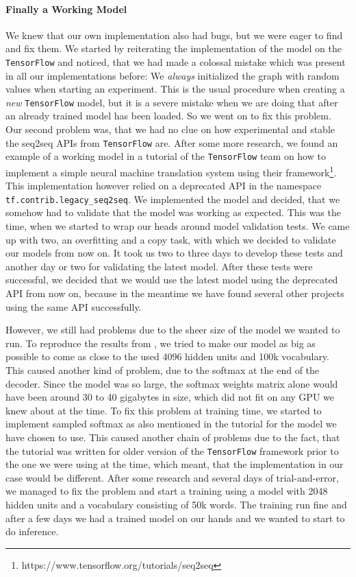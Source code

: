 \paragraph{Finally a Working Model} We knew that our own implementation also had bugs, but we were eager to find and fix them. We started by reiterating the implementation of the model on the \texttt{TensorFlow} and noticed, that we had made a colossal mistake which was present in all our implementations before: We \emph{always} initialized the graph with random values when starting an experiment. This is the usual procedure when creating a \emph{new} \texttt{TensorFlow} model, but it is a severe mistake when we are doing that after an already trained model has been loaded. So we went on to fix this problem. Our second problem was, that we had no clue on how experimental and stable the seq2seq APIs from \texttt{TensorFlow} are. After some more research, we found an example of a working model in a tutorial of the \texttt{TensorFlow} team on how to implement a simple neural machine translation system using their framework\footnote{https://www.tensorflow.org/tutorials/seq2seq}. This implementation however relied on a deprecated API in the namespace \texttt{tf.contrib.legacy\_seq2seq}. We implemented the model and decided, that we somehow had to validate that the model was working as expected. This was the time, when we started to wrap our heads around model validation tests. We came up with two, an overfitting and a copy task, with which we decided to validate our models from now on. It took us two to three days to develop these tests and another day or two for validating the latest model. After these tests were successful, we decided that we would use the latest model using the deprecated API from now on, because in the meantime we have found several other projects using the same API successfully.

However, we still had problems due to the sheer size of the model we wanted to run. To reproduce the results from \cite{Vinyals:2015}, we tried to make our model as big as possible to come as close to the used 4096 hidden units and 100k vocabulary. This caused another kind of problem, due to the softmax at the end of the decoder. Since the model was so large, the softmax weights matrix alone would have been around 30 to 40 gigabytes in size, which did not fit on any GPU we knew about at the time. To fix this problem at training time, we started to implement sampled softmax as also mentioned in the tutorial for the model we have chosen to use. This caused another chain of problems due to the fact, that the tutorial was written for older version of the \texttt{TensorFlow} framework prior to the one we were using at the time, which meant, that the implementation in our case would be different. After some research and several days of trial-and-error, we managed to fix the problem and start a training using a model with 2048 hidden units and a vocabulary consisting of 50k words. The training run fine and after a few days we had a trained model on our hands and we wanted to start to do inference.

